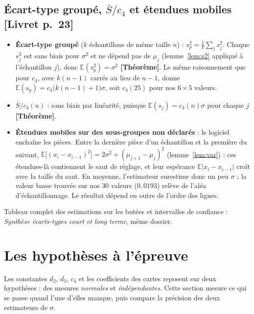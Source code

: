\documentclass[11pt,a4paper]{article}
\theoremstyle{tq}
\theoremstyle{remark}
\newcommand{\thm}{\textcolor{vertTQ}{\textbf{[Théorème]}}}
\newcommand{\liv}[1]{\textcolor{uimmblue}{\small[Livret p.~#1]}}
\newcommand{\E}{\mathbb{E}}
\begin{document}
\subsection{Écart-type groupé, $\bar S/c_4$ et étendues mobiles \liv{23}}
\begin{itemize}[leftmargin=1.2em]
\item \textbf{Écart-type groupé} ($k$ échantillons de même taille $n$) : $s_p^2=\frac1k\sum_js_j^2$. Chaque $s_j^2$ est sans biais pour $\sigma^2$ et ne dépend pas de $\mu_j$ (lemme~\ref{lem:s2} appliqué à l'échantillon $j$), donc $\E(s_p^2)=\sigma^2$ \thm{}. Le même raisonnement que pour $c_4$, avec $k(n-1)$ carrés au lieu de $n-1$, donne $\E(s_p)=c_4\big(k(n-1)+1\big)\sigma$, soit $c_4(25)$ pour nos $6\times5$ valeurs.
\item \textbf{$\bar S/c_4(n)$} : sans biais par linéarité, puisque $\E(s_j)=c_4(n)\sigma$ pour chaque $j$ \thm{}.
\item \textbf{Étendues mobiles sur des sous-groupes non déclarés} : le logiciel enchaîne les pièces. Entre la dernière pièce d'un échantillon et la première du suivant, $\E\big[(x_i-x_{i-1})^2\big]=2\sigma^2+(\mu_{j+1}-\mu_j)^2$ (lemme~\ref{lem:var}) : ces étendues-là contiennent le saut de réglage, et leur espérance $\E|x_i-x_{i-1}|$ croît avec la taille du saut. En moyenne, l'estimateur surestime donc un peu $\sigma$ ; la valeur basse trouvée sur nos 30 valeurs ($0{,}0193$) relève de l'aléa d'échantillonnage. Le résultat dépend en outre de l'ordre des lignes.
\end{itemize}
Tableau complet des estimations sur les butées et intervalles de confiance : \emph{Synthèse écarts-types court et long terme}, même dossier.

\section{Les hypothèses à l'épreuve}\label{sec:hyp}

Les constantes $d_2$, $d_3$, $c_4$ et les coefficients des cartes reposent sur deux hypothèses : des mesures \emph{normales} et \emph{indépendantes}. Cette section mesure ce qui se passe quand l'une d'elles manque, puis compare la précision des deux estimateurs de $\sigma$.
\end{document}
